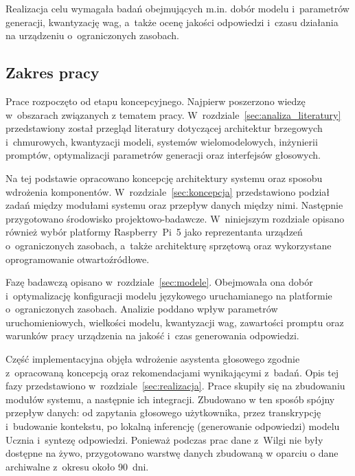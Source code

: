Realizacja celu wymagała badań obejmujących m.in. dobór modelu i~parametrów generacji, kwantyzację wag, a~także ocenę jakości odpowiedzi i~czasu działania na urządzeniu o~ograniczonych zasobach.

\subsection{Zakres pracy}

Prace rozpoczęto od etapu koncepcyjnego. Najpierw poszerzono wiedzę w~obszarach związanych z tematem pracy. W~rozdziale~\ref{sec:analiza_literatury} przedstawiony został przegląd literatury dotyczącej architektur brzegowych i~chmurowych, kwantyzacji modeli, systemów wielomodelowych, inżynierii promptów, optymalizacji parametrów generacji oraz interfejsów głosowych.

Na tej podstawie opracowano koncepcję architektury systemu oraz sposobu wdrożenia komponentów. W~rozdziale~\ref{sec:koncepcja} przedstawiono podział zadań między modułami systemu oraz przepływ danych między nimi. Następnie przygotowano środowisko projektowo-badawcze. W~niniejszym rozdziale opisano również wybór platformy Raspberry~Pi~5 jako reprezentanta urządzeń o~ograniczonych zasobach, a~także architekturę sprzętową oraz wykorzystane oprogramowanie otwartoźródłowe.

Fazę badawczą opisano w~rozdziale~\ref{sec:modele}. Obejmowała ona dobór i~optymalizację konfiguracji modelu językowego uruchamianego na platformie o~ograniczonych zasobach. Analizie poddano wpływ parametrów uruchomieniowych, wielkości modelu, kwantyzacji wag, zawartości promptu oraz warunków pracy urządzenia na jakość i~czas generowania odpowiedzi.

Część implementacyjna objęła wdrożenie asystenta głosowego zgodnie z~opracowaną koncepcją oraz rekomendacjami wynikającymi z~badań. Opis tej fazy przedstawiono w~rozdziale~\ref{sec:realizacja}. Prace skupiły się na zbudowaniu modułów systemu, a następnie ich integracji. Zbudowano w ten sposób spójny przepływ danych: od zapytania głosowego użytkownika, przez transkrypcję i~budowanie kontekstu, po lokalną inferencję (generowanie odpowiedzi) modelu Ucznia i~syntezę odpowiedzi. Ponieważ podczas prac dane z~Wilgi nie były dostępne na żywo, przygotowano warstwę danych zbudowaną w oparciu o dane archiwalne z~okresu około 90~dni.

